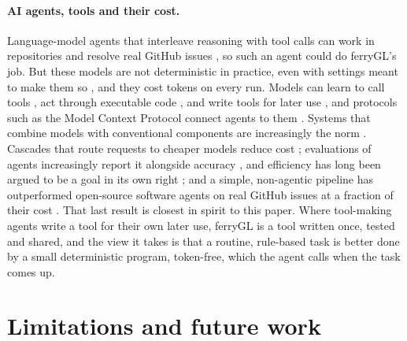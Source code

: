 \documentclass[11pt,a4paper]{article}
\newcommand{\ferry}{ferryGL}
\begin{document}
\paragraph{AI agents, tools and their cost.} Language-model agents that interleave reasoning with
tool calls \cite{yao2023react} can work in repositories and resolve real GitHub issues
\cite{yang2024sweagent, jimenez2024swebench}, so such an agent could do \ferry's job. But these
models are not deterministic in practice, even with settings meant to make them so
\cite{ouyang2025empirical, atil2025nondeterminism}, and they cost tokens on every run. Models can
learn to call tools \cite{schick2023toolformer}, act through executable code
\cite{wang2024codeact}, and write tools for later use \cite{cai2024tool}, and protocols such as
the Model Context Protocol connect agents to them \cite{anthropic2024mcp}. Systems that
combine models with conventional components are increasingly the norm
\cite{zaharia2024compound}. Cascades that route requests to cheaper models reduce cost
\cite{chen2024frugalgpt}; evaluations of agents increasingly report it alongside accuracy
\cite{kapoor2025agents}, and efficiency has long been argued to be a goal in its own right
\cite{schwartz2020green}; and a simple, non-agentic pipeline has outperformed open-source
software agents on real GitHub issues at a fraction of their cost \cite{xia2025agentless}. That
last result is closest in spirit to this paper. Where tool-making agents write a tool for their
own later use, \ferry{} is a tool written once, tested and shared, and the view it takes is that
a routine, rule-based task is better done by a small deterministic program, token-free, which
the agent calls when the task comes up.

\section{Limitations and future work}
\label{sec:limitations}
\end{document}
